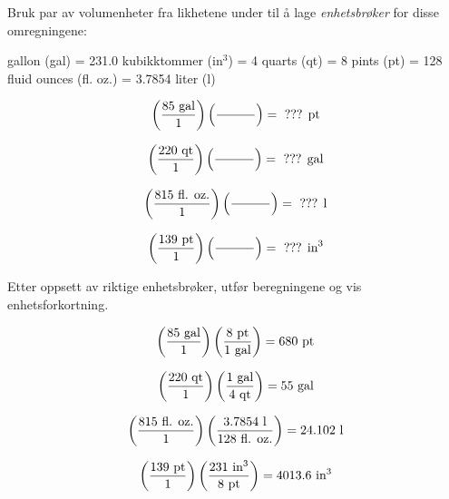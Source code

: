 

Bruk par av volumenheter fra likhetene under til å lage {\it enhetsbrøker} for disse omregningene:

\vskip 10pt

 gallon (gal) = 231.0 kubikktommer (in$^{3}$) = 4 quarts (qt) = 8 pints (pt) = 128 fluid ounces (fl. oz.) = 3.7854 liter (l)

$$\left(85 \hbox{ gal} \over 1 \right) \left(\hbox{\hskip 30pt} \over \hbox{\hskip 30pt}\right) = \hbox{ ??? pt} $$

$$\left(220 \hbox{ qt} \over 1 \right) \left(\hbox{\hskip 30pt} \over \hbox{\hskip 30pt}\right) = \hbox{ ??? gal} $$

$$\left(815 \hbox{ fl. oz.} \over 1 \right) \left(\hbox{\hskip 30pt} \over \hbox{\hskip 30pt}\right) = \hbox{ ??? l} $$

$$\left(139 \hbox{ pt} \over 1 \right) \left(\hbox{\hskip 30pt} \over \hbox{\hskip 30pt}\right) = \hbox{ ??? in}^3 $$

Etter oppsett av riktige enhetsbrøker, utfør beregningene og vis enhetsforkortning.







$$\left(85 \hbox{ gal} \over 1 \right) \left(8 \hbox{ pt} \over 1 \hbox{ gal}\right) = 680 \hbox{ pt} $$

$$\left(220 \hbox{ qt} \over 1 \right) \left(1 \hbox{ gal} \over 4 \hbox{ qt}\right) = 55 \hbox{ gal} $$

$$\left(815 \hbox{ fl. oz.} \over 1 \right) \left(3.7854 \hbox{ l} \over 128 \hbox{ fl. oz.}\right) = 24.102 \hbox{ l} $$

$$\left(139 \hbox{ pt} \over 1 \right) \left(231 \hbox{ in}^3 \over 8 \hbox{ pt}\right) = 4013.6 \hbox{ in}^3 $$









